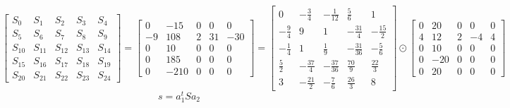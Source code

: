 \documentclass{article}%
\begin{document}
\[%
\left[\begin{matrix}S_{0} & S_{1} & S_{2} & S_{3} & S_{4}\\S_{5} & S_{6} & S_{7} & S_{8} & S_{9}\\S_{10} & S_{11} & S_{12} & S_{13} & S_{14}\\S_{15} & S_{16} & S_{17} & S_{18} & S_{19}\\S_{20} & S_{21} & S_{22} & S_{23} & S_{24}\end{matrix}\right] = \left[\begin{matrix}0 & -15 & 0 & 0 & 0\\-9 & 108 & 2 & 31 & -30\\0 & 10 & 0 & 0 & 0\\0 & 185 & 0 & 0 & 0\\0 & -210 & 0 & 0 & 0\end{matrix}\right] = \left[\begin{matrix}0 & - \frac{3}{4} & - \frac{1}{12} & \frac{5}{6} & 1\\- \frac{9}{4} & 9 & 1 & - \frac{31}{4} & - \frac{15}{2}\\- \frac{1}{4} & 1 & \frac{1}{9} & - \frac{31}{36} & - \frac{5}{6}\\\frac{5}{2} & - \frac{37}{4} & - \frac{37}{36} & \frac{70}{9} & \frac{22}{3}\\3 & - \frac{21}{2} & - \frac{7}{6} & \frac{26}{3} & 8\end{matrix}\right] \odot \left[\begin{matrix}0 & 20 & 0 & 0 & 0\\4 & 12 & 2 & -4 & 4\\0 & 10 & 0 & 0 & 0\\0 & -20 & 0 & 0 & 0\\0 & 20 & 0 & 0 & 0\end{matrix}\right]%
\]%
\[%
s = a_1^t S a_2%
\]%
\end{document}
